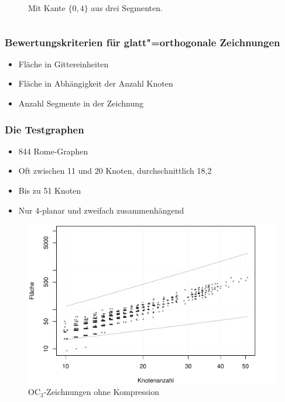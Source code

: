 \documentclass{beamer}
\begin{document}
\begin{frame}
\begin{columns}[b]
\begin{column}{5cm}
\begin{figure}[h]
  \caption{Mit Kante $\{0,4\}$ aus drei Segmenten.}
  \label{fig:exampleAsmoothComplex}
\end{figure}
\end{column}
\end{columns}
\end{frame}


\begin{frame}
  \frametitle{Bewertungskriterien für glatt"=orthogonale Zeichnungen}
  \begin{itemize}[<+->]
    \item Fläche in Gittereinheiten
    \item Fläche in Abhängigkeit der Anzahl Knoten
    \item Anzahl Segmente in der Zeichnung
  \end{itemize}
\end{frame}

\begin{frame}
  \frametitle{Die Testgraphen}
  \begin{itemize}[<+->]
    \item 844 Rome-Graphen
    \item Oft zwischen 11 und 20 Knoten, durchschnittlich 18,2
    \item Bis zu 51 Knoten
    \item Nur 4-planar und zweifach zusammenhängend
  \end{itemize}
\end{frame}


\begin{frame}
\begin{figure}[h]
  \centering
  \includegraphics[width=.9\textwidth]{plots/area_orthogonal}
  \caption{OC$_3$-Zeichnungen ohne Kompression}
  \label{fig:ortho-compress}
\end{figure}
\end{frame}
\end{document}
